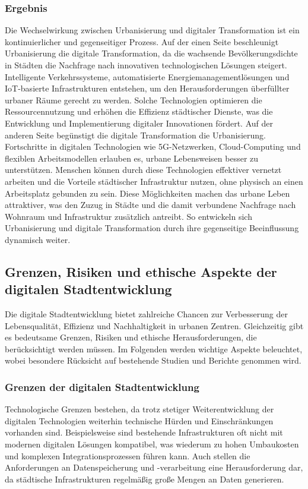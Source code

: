 \documentclass[conference,compsoc,final,a4paper, onecolumn, 11pt]{IEEEtran}
\begin{document}
\subsubsection{Ergebnis}
Die Wechselwirkung zwischen Urbanisierung und digitaler Transformation ist ein kontinuierlicher und gegenseitiger Prozess.
Auf der einen Seite beschleunigt Urbanisierung die digitale Transformation, da die wachsende Bevölkerungsdichte in Städten die Nachfrage nach innovativen technologischen Lösungen steigert. 
Intelligente Verkehrssysteme, automatisierte Energiemanagementlösungen und \ac{IoT}-basierte Infrastrukturen entstehen, um den Herausforderungen überfüllter urbaner Räume gerecht zu werden. 
Solche Technologien optimieren die Ressourcennutzung und erhöhen die Effizienz städtischer Dienste, was die Entwicklung und Implementierung digitaler Innovationen fördert.
Auf der anderen Seite begünstigt die digitale Transformation die Urbanisierung. 
Fortschritte in digitalen Technologien wie 5G-Netzwerken, Cloud-Computing und flexiblen Arbeitsmodellen erlauben es, urbane Lebensweisen besser zu unterstützen. 
Menschen können durch diese Technologien effektiver vernetzt arbeiten und die Vorteile städtischer Infrastruktur nutzen, ohne physisch an einen Arbeitsplatz gebunden zu sein. 
Diese Möglichkeiten machen das urbane Leben attraktiver, was den Zuzug in Städte und die damit verbundene Nachfrage nach Wohnraum und Infrastruktur zusätzlich antreibt.
So entwickeln sich Urbanisierung und digitale Transformation durch ihre gegenseitige Beeinflussung dynamisch weiter. 


\subsection{Grenzen, Risiken und ethische Aspekte der digitalen Stadtentwicklung}
Die digitale Stadtentwicklung bietet zahlreiche Chancen zur Verbesserung der Lebensqualität, Effizienz und Nachhaltigkeit in urbanen Zentren. 
Gleichzeitig gibt es bedeutsame Grenzen, Risiken und ethische Herausforderungen, die berücksichtigt werden müssen. 
Im Folgenden werden wichtige Aspekte beleuchtet, wobei besondere Rücksicht auf bestehende Studien und Berichte genommen wird.

\subsubsection{Grenzen der digitalen Stadtentwicklung}
Technologische Grenzen bestehen, da trotz stetiger Weiterentwicklung der digitalen Technologien weiterhin technische Hürden und Einschränkungen vorhanden sind. 
Beispielsweise sind bestehende Infrastrukturen oft nicht mit modernen digitalen Lösungen kompatibel, was wiederum zu hohen Umbaukosten und komplexen Integrationsprozessen führen kann. \autocite{kitchin_ethics_2016} 
Auch stellen die Anforderungen an Datenspeicherung und -verarbeitung eine Herausforderung dar, da städtische Infrastrukturen regelmäßig große Mengen an Daten generieren.
\end{document}
